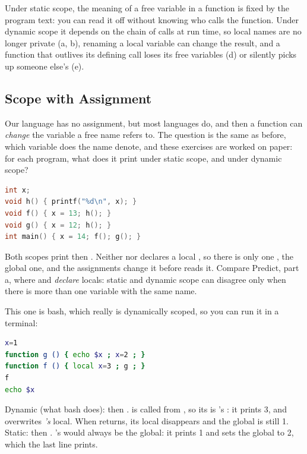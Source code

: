 \begin{keypoint}
Under static scope, the meaning of a free variable in a function is fixed by the program text: you can read it off without knowing who calls the function. Under dynamic scope it depends on the chain of calls at run time, so local names are no longer private (a, b), renaming a local variable can change the result, and a function that outlives its defining call loses its free variables (d) or silently picks up someone else's (e).
\end{keypoint}

\subsection{Scope with Assignment}

Our language has no assignment, but most languages do, and then a function can \emph{change} the variable a free name refers to. The question is the same as before, which variable does the name denote, and these exercises are worked on paper: for each program, what does it print under static scope, and under dynamic scope?

\begin{exercise}
\begin{lstlisting}[language=C]
int x;
void h() { printf("%d\n", x); }
void f() { x = 13; h(); }
void g() { x = 12; h(); }
int main() { x = 14; f(); g(); }
\end{lstlisting}
\end{exercise}
\begin{solution}
Both scopes print  then . Neither  nor  declares a local , so there is only one , the global one, and the assignments change it before  reads it. Compare Predict, part a, where  and  \emph{declare} locals: static and dynamic scope can disagree only when there is more than one variable with the same name.
\end{solution}

\begin{exercise}
This one is bash, which really is dynamically scoped, so you can run it in a terminal:
\begin{lstlisting}[language=bash]
x=1
function g () { echo $x ; x=2 ; }
function f () { local x=3 ; g ; }
f
echo $x
\end{lstlisting}
\end{exercise}
\begin{solution}
Dynamic (what bash does):  then .  is called from , so its  is 's : it prints 3, and  overwrites \emph{'s} local. When  returns, its local disappears and the global  is still 1. Static:  then . 's  would always be the global: it prints 1 and sets the global to 2, which the last line prints.
\end{solution}

